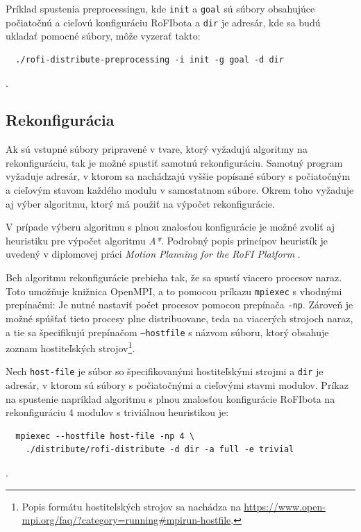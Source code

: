 \documentclass[
  printed, %
  oneside, %
  notable,   %
  nolof,     %
  nolot,     %
]{fithesis3}
\begin{document}
Príklad spustenia preprocessingu, kde \texttt{init} a \texttt{goal} sú súbory obsahujúce počiatočnú a cieľovú konfiguráciu RoFIbota a \texttt{dir} je adresár, kde sa budú ukladať pomocné súbory, môže vyzerať takto:

\begin{verbatim}
  ./rofi-distribute-preprocessing -i init -g goal -d dir
\end{verbatim}.

\subsection{Rekonfigurácia}
Ak sú vstupné súbory pripravené v tvare, ktorý vyžadujú algoritmy na rekonfiguráciu, tak je možné spustiť samotnú rekonfiguráciu. Samotný program vyžaduje adresár, v ktorom sa nachádzajú vyššie popísané súbory s počiatočným a cieľovým stavom každého modulu v samostatnom súbore. Okrem toho vyžaduje aj výber algoritmu, ktorý má použiť na výpočet rekonfigurácie. 

V prípade výberu algoritmu s plnou znalosťou konfigurácie je možné zvoliť aj heuristiku pre výpočet algoritmu \textit{A*}. Podrobný popis princípov heuristík je uvedený v diplomovej práci \textit{Motion Planning for the RoFI Platform} \cite{vozarovaMasterThesis}. 

Beh algoritmu rekonfigurácie prebieha tak, že sa spustí viacero procesov naraz. Toto umožňuje knižnica OpenMPI, a to pomocou príkazu \texttt{mpiexec} s vhodnými prepínačmi: Je nutné nastaviť počet procesov pomocou prepínača \texttt{-np}. Zároveň je možné spúšťať tieto procesy plne distribuovane, teda na viacerých strojoch naraz, a tie sa špecifikujú prepínačom \texttt{--hostfile} s názvom súboru, ktorý obsahuje zoznam hostiteľských strojov\footnote{Popis formátu hostiteľských strojov sa nachádza na \url{https://www.open-mpi.org/faq/?category=running\#mpirun-hostfile}.}. 

Nech \texttt{host-file} je súbor so špecifikovanými hostiteľskými strojmi a \texttt{dir} je adresár, v ktorom sú súbory s počiatočnými a cieľovými stavmi modulov. Príkaz na spustenie napríklad algoritmu s plnou znalosťou konfigurácie RoFIbota na rekonfiguráciu $4$ modulov s triviálnou heuristikou je: 
\begin{verbatim}
  mpiexec --hostfile host-file -np 4 \
    ./distribute/rofi-distribute -d dir -a full -e trivial
\end{verbatim}.
\end{document}
